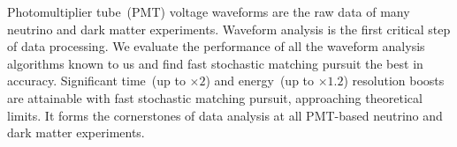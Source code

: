 Photomultiplier tube~(PMT) voltage waveforms are the raw data of many neutrino and dark matter experiments. Waveform analysis is the first critical step of data processing. We evaluate the performance of all the waveform analysis algorithms known to us and find fast stochastic matching pursuit the best in accuracy. Significant time~(up to $\times 2$) and energy~(up to $\times 1.2$) resolution boosts are attainable with fast stochastic matching pursuit, approaching theoretical limits.  It forms the cornerstones of data analysis at all PMT-based neutrino and dark matter experiments.